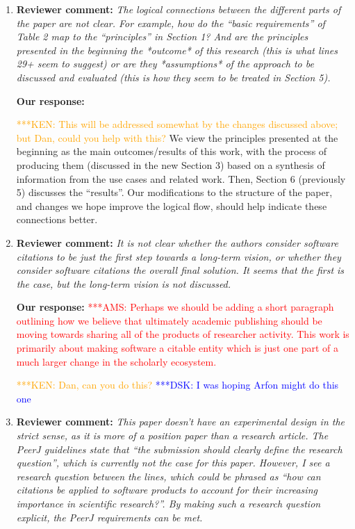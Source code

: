 \documentclass{article}
\newcommand{\katznote}[1]{ {\textcolor{blue} { ***DSK: #1 }}} %
\newcommand{\niemnote}[1]{ {\textcolor{orange} { ***KEN: #1 }}} %
\newcommand{\asnote}[1]{ {\textcolor{red} { ***AMS: #1 }}} %
\begin{document}
\begin{enumerate}
\item \textbf{Reviewer comment:}
\emph{The logical connections between the different parts of the paper are not clear. For example, how do the ``basic requirements'' of Table 2 map to the ``principles'' in Section 1? And are the principles presented in the beginning the *outcome* of this research (this is what lines 29+ seem to suggest) or are they *assumptions* of the approach to be discussed and evaluated (this is how they seem to be treated in Section 5).}

\textbf{Our response:}

\niemnote{This will be addressed somewhat by the changes discussed above; but Dan, could you help with this?}
We view the principles presented at the beginning as the main outcomes\slash results of this work, with the process of producing them (discussed in the new Section 3) based on a synthesis of information from the use cases and related work. Then, Section 6 (previously 5) discusses the ``results''.
Our modifications to the structure of the paper, and changes we hope improve the logical flow, should help indicate these connections better.

\item \textbf{Reviewer comment:}
\emph{It is not clear whether the authors consider software citations to be just the first step towards a long-term vision, or whether they consider software citations the overall final solution. It seems that the first is the case, but the long-term vision is not discussed.}

\textbf{Our response:}
\asnote{Perhaps we should be adding a short paragraph outlining how we believe that ultimately academic publishing should be moving towards sharing all of the products of researcher activity. This work is primarily about making software a citable entity which is just one part of a much larger change in the scholarly ecosystem.}

\niemnote{Dan, can you do this?} \katznote{I was hoping Arfon might do this one}

\item \textbf{Reviewer comment:}
\emph{This paper doesn't have an experimental design in the strict sense, as it is more of a position paper than a research article. The PeerJ guidelines state that ``the submission should clearly define the research question'', which is currently not the case for this paper. However, I see a research question between the lines, which could be phrased as ``how can citations be applied to software products to account for their increasing importance in scientific research?''. By making such a research question explicit, the PeerJ requirements can be met.}


\end{enumerate}
\end{document}
